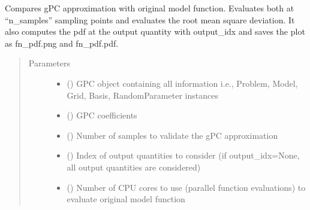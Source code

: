 \documentclass[letterpaper,10pt,english,openany,oneside]{sphinxmanual}
\begin{document}
\begin{fulllineitems}
\label{\detokenize{pygpc:pygpc.validation.validate_gpc_mc}}
Compares gPC approximation with original model function. Evaluates both at “n\_samples” sampling points and
evaluates the root mean square deviation. It also computes the pdf at the output quantity with output\_idx
and saves the plot as fn\_pdf.png and fn\_pdf.pdf.
\begin{quote}\begin{description}
\item[{Parameters}] \leavevmode\begin{itemize}
\item {} 
 () \textendash{} GPC object containing all information i.e., Problem, Model, Grid, Basis, RandomParameter instances

\item {} 
 (\sphinxstyleliteralemphasis{\sphinxupquote{ {[}}}\sphinxstyleliteralemphasis{\sphinxupquote{{]}}}) \textendash{} GPC coefficients

\item {} 
 () \textendash{} Number of samples to validate the gPC approximation

\item {} 
 (\sphinxstyleliteralemphasis{\sphinxupquote{, }}\sphinxstyleliteralemphasis{\sphinxupquote{, }}\sphinxstyleliteralemphasis{\sphinxupquote{ {[}}}\sphinxstyleliteralemphasis{\sphinxupquote{{]}}}) \textendash{} Index of output quantities to consider (if output\_idx=None, all output quantities are considered)

\item {} 
 (\sphinxstyleliteralemphasis{\sphinxupquote{, }}\sphinxstyleliteralemphasis{\sphinxupquote{, }}) \textendash{} Number of CPU cores to use (parallel function evaluations) to evaluate original model function


\end{itemize}
\end{description}
\end{quote}
\end{fulllineitems}
\end{document}
